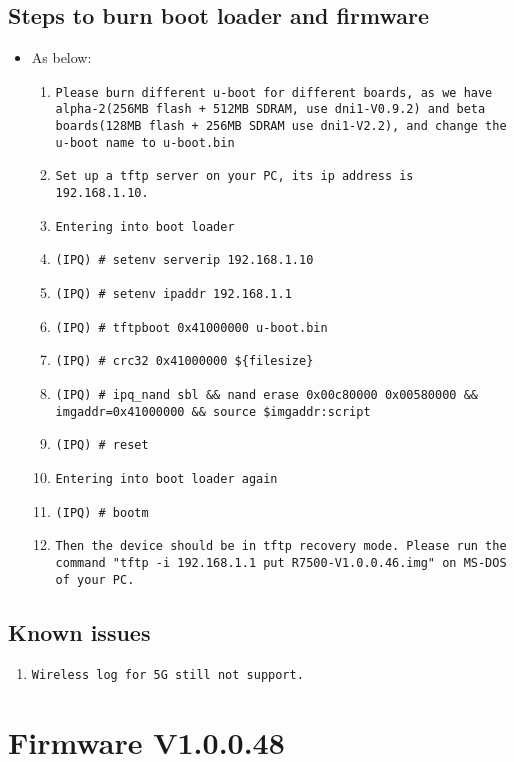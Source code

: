 \documentclass[12pt]{report}
\begin{document}
    \subsection{Steps to burn boot loader and firmware}
    \begin{itemize}
    \item As below:
            \begin{enumerate}
	    	\item \texttt{Please burn different u-boot for different boards, as we have alpha-2(256MB flash + 512MB SDRAM, use dni1-V0.9.2) and beta boards(128MB flash + 256MB SDRAM use dni1-V2.2), and change the u-boot name to u-boot.bin}
		\item \texttt{Set up a tftp server on your PC, its ip address is 192.168.1.10.}
		\item \texttt{Entering into boot loader}
		\item \texttt{(IPQ) \# setenv serverip 192.168.1.10}
		\item \texttt{(IPQ) \# setenv ipaddr 192.168.1.1}
		\item \texttt{(IPQ) \# tftpboot 0x41000000 u-boot.bin}
		\item \texttt{(IPQ) \# crc32 0x41000000 \$\{filesize\}}
		\item \texttt{(IPQ) \# ipq\_nand sbl \&\& nand erase 0x00c80000 0x00580000 \&\& imgaddr=0x41000000 \&\& source \$imgaddr:script}
		\item \texttt{(IPQ) \# reset}
		\item \texttt{Entering into boot loader again}
		\item \texttt{(IPQ) \# bootm}
		\item \texttt{Then the device should be in tftp recovery mode. Please run the command "tftp -i 192.168.1.1 put R7500-V1.0.0.46.img" on MS-DOS of your PC.}
            \end{enumerate}
    \end{itemize}

\subsection{Known issues}
            \begin{enumerate}
		\item \texttt{Wireless log for 5G still not support.}
            \end{enumerate}

\section{Firmware V1.0.0.48}
\end{document}

